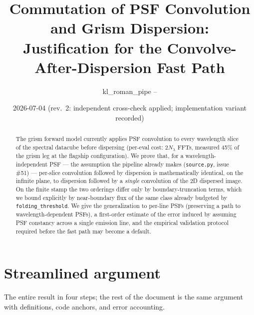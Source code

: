 \documentclass[11pt]{article}
\title{Commutation of PSF Convolution and Grism Dispersion:\\
Justification for the Convolve-After-Dispersion Fast Path}
\author{kl\_roman\_pipe -- \code{docs/derivations/psf\_dispersion\_commutation.tex}}
\date{2026-07-04 (rev.\ 2: independent cross-check applied; implementation
variant recorded)}
\newcommand{\code}[1]{\texttt{#1}}
\begin{document}
\maketitle

\begin{abstract}
The grism forward model currently applies PSF convolution to every wavelength
slice of the spectral datacube before dispersing (per-eval cost: $2N_\lambda$
FFTs, measured 45\% of the grism leg at the flagship configuration). We prove
that, for a wavelength-independent PSF --- the assumption the pipeline already
makes (\code{source.py}, issue \#51) --- per-slice convolution followed by
dispersion is mathematically identical, on the infinite plane, to dispersion
followed by a \emph{single} convolution of the 2D dispersed image. On the
finite stamp the two orderings differ only by boundary-truncation terms, which
we bound explicitly by near-boundary flux of the same class already budgeted
by \code{folding\_threshold}. We give the generalization to per-line PSFs
(preserving a path to wavelength-dependent PSFs), a first-order estimate of
the error induced by assuming PSF constancy across a single emission line, and
the empirical validation protocol required before the fast path may become a
default.
\end{abstract}

\section{Streamlined argument}
\label{sec:streamlined}

The entire result in four steps; the rest of the document is the same
argument with definitions, code anchors, and error accounting.
\end{document}
